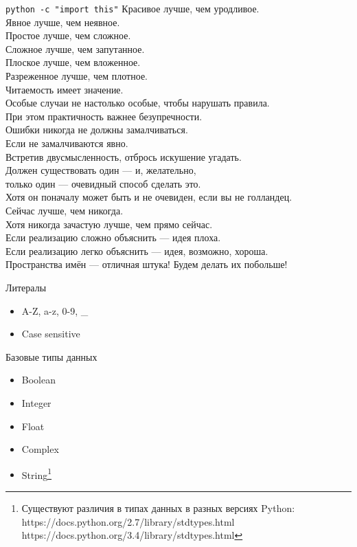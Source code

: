 \documentclass[hyperref={pdftex,unicode}]{beamer}
\begin{document}
\begin{frame}{\texttt{python -c "import this"}}
\footnotesize{
Красивое лучше, чем уродливое. \\
Явное лучше, чем неявное. \\
Простое лучше, чем сложное. \\
Сложное лучше, чем запутанное. \\
Плоское лучше, чем вложенное. \\
Разреженное лучше, чем плотное. \\
Читаемость имеет значение. \\
Особые случаи не настолько особые, чтобы нарушать правила. \\
При этом практичность важнее безупречности. \\
Ошибки никогда не должны замалчиваться. \\
Если не замалчиваются явно. \\
Встретив двусмысленность, отбрось искушение угадать. \\
Должен существовать один --- и, желательно, \\
\hspace{20.6mm} только один --- очевидный способ сделать это. \\
Хотя он поначалу может быть и не очевиден, если вы не голландец. \\
Сейчас лучше, чем никогда. \\
Хотя никогда зачастую лучше, чем прямо сейчас. \\
Если реализацию сложно объяснить --- идея плоха. \\
Если реализацию легко объяснить --- идея, возможно, хороша. \\
Пространства имён — отличная штука! Будем делать их побольше!
}
\end{frame}

\begin{frame}{Литералы}
  \begin{itemize}
    \item A-Z, a-z, 0-9, \_
    \item Case sensitive
  \end{itemize}
\end{frame}

\begin{frame}{Базовые типы данных}
  \begin{itemize}
    \item Boolean
    \item Integer
    \item Float
    \item Complex
    \item String\footnote[frame]{
        Существуют различия в типах данных в разных версиях Python: \\
        https://docs.python.org/2.7/library/stdtypes.html \\
        https://docs.python.org/3.4/library/stdtypes.html}
  \end{itemize}
\end{frame}
\end{document}
